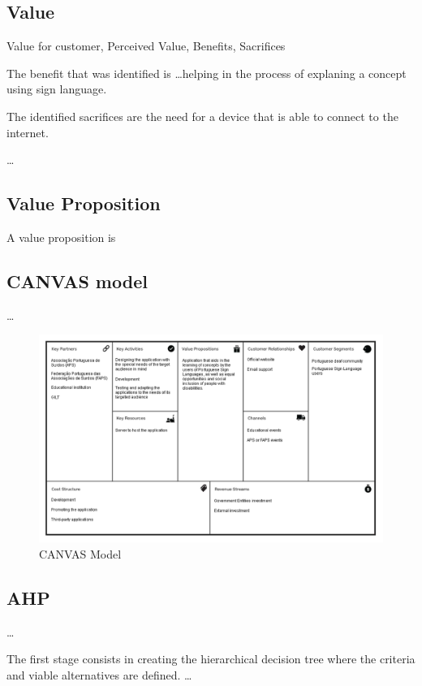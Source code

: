 \subsection{Value}

Value for customer, Perceived Value, Benefits, Sacrifices

The benefit that was identified is \dots helping in the process of explaning a concept using sign language.

The identified sacrifices are the need for a device that is able to connect to the internet.

\dots

\subsection{Value Proposition}

A value proposition is 

\subsection{CANVAS model}

\dots

\begin{figure}[H]
\centering
\includegraphics[width=\textwidth,keepaspectratio]{ch2/assets/CANVAS.png}
\caption[CANVAS]{CANVAS Model}
\label{fig:CANVAS}
\end{figure}

\subsection{AHP}

\dots

The first stage consists in creating the hierarchical decision tree where the criteria and viable alternatives are defined.
\dots

